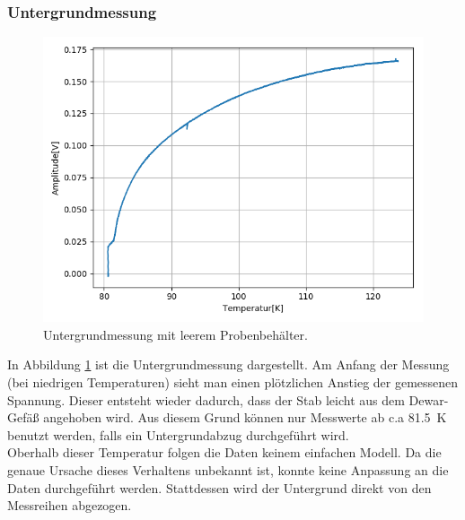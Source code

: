 \documentclass[12pt,a4paper]{article}
\begin{document}
\subsubsection{Untergrundmessung}
\begin{figure}
\centering
\includegraphics[scale=0.8]{Bilder/Haupt_Supra/Untergrund.png}
\caption{Untergrundmessung mit leerem Probenbehälter.}
\label{fig:Supra_Untergrund}
\end{figure}

In Abbildung \ref{fig:Supra_Untergrund} ist die Untergrundmessung dargestellt. Am Anfang der Messung (bei niedrigen Temperaturen) sieht man einen plötzlichen Anstieg der gemessenen Spannung. Dieser entsteht wieder dadurch, dass der Stab leicht aus dem Dewar-Gefäß angehoben wird. Aus diesem Grund können nur Messwerte ab c.a \SI{81,5}{K} benutzt werden, falls ein Untergrundabzug durchgeführt wird.\\
Oberhalb dieser Temperatur folgen die Daten keinem einfachen Modell. Da die genaue Ursache dieses Verhaltens unbekannt ist, konnte keine Anpassung an die Daten durchgeführt werden. Stattdessen wird der Untergrund direkt von den Messreihen abgezogen.
\end{document}
